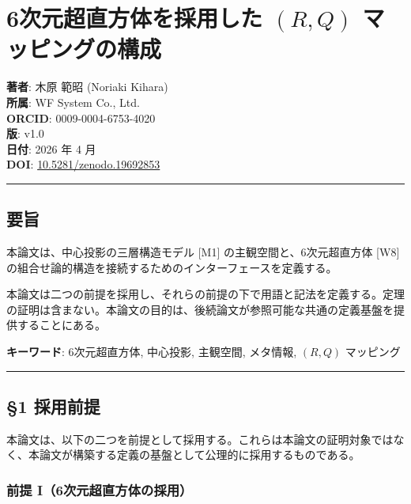 \documentclass[
  a4paper,11pt]{ltjsarticle}
\theoremstyle{definition}
\theoremstyle{remark}
\begin{document}
\section{\texorpdfstring{6次元超直方体を採用した \((R, Q)\)
マッピングの構成}{6次元超直方体を採用した (R, Q) マッピングの構成}}\label{ux6b21ux5143ux8d85ux76f4ux65b9ux4f53ux3092ux63a1ux7528ux3057ux305f-r-q-ux30deux30c3ux30d4ux30f3ux30b0ux306eux69cbux6210}

\textbf{著者}: 木原 範昭 (Noriaki Kihara)\\
\textbf{所属}: WF System Co., Ltd.\\
\textbf{ORCID}: 0009-0004-6753-4020\\
\textbf{版}: v1.0\\
\textbf{日付}: 2026 年 4 月\\
\textbf{DOI}:
\href{https://doi.org/10.5281/zenodo.19692853}{10.5281/zenodo.19692853}

\begin{center}\rule{0.5\linewidth}{0.5pt}\end{center}

\subsection{要旨}\label{ux8981ux65e8}

本論文は、中心投影の三層構造モデル {[}M1{]} の主観空間と、6次元超直方体
{[}W8{]} の組合せ論的構造を接続するためのインターフェースを定義する。

本論文は二つの前提を採用し、それらの前提の下で用語と記法を定義する。定理の証明は含まない。本論文の目的は、後続論文が参照可能な共通の定義基盤を提供することにある。

\textbf{キーワード}: 6次元超直方体, 中心投影, 主観空間, メタ情報,
\((R, Q)\) マッピング

\begin{center}\rule{0.5\linewidth}{0.5pt}\end{center}

\subsection{§1 採用前提}\label{ux63a1ux7528ux524dux63d0}

本論文は、以下の二つを前提として採用する。これらは本論文の証明対象ではなく、本論文が構築する定義の基盤として公理的に採用するものである。

\subsubsection{前提
I（6次元超直方体の採用）}\label{ux524dux63d0-i6ux6b21ux5143ux8d85ux76f4ux65b9ux4f53ux306eux63a1ux7528}
\end{document}
